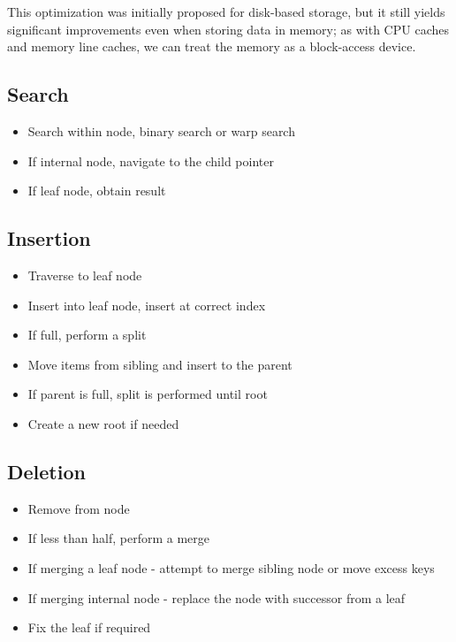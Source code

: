 This optimization was initially proposed for disk-based storage, but it still yields significant improvements even when storing data in memory; as with CPU caches and memory line caches, we can treat the memory as a block-access device.

\subsection{Search}

\begin{itemize}
  \item Search within node, binary search or warp search
  \item If internal node, navigate to the child pointer
  \item If leaf node, obtain result
\end{itemize}

\subsection{Insertion}

\begin{itemize}
  \item Traverse to leaf node
  \item Insert into leaf node, insert at correct index
  \item If full, perform a split
  \item Move items from sibling and insert to the parent
  \item If parent is full, split is performed until root
  \item Create a new root if needed
\end{itemize}


\subsection{Deletion}

\begin{itemize}
  \item Remove from node
  \item If less than half, perform a merge
  \item If merging a leaf node - attempt to merge sibling node or move excess keys
  \item If merging internal node - replace the node with successor from a leaf
  \item Fix the leaf if required
\end{itemize}



